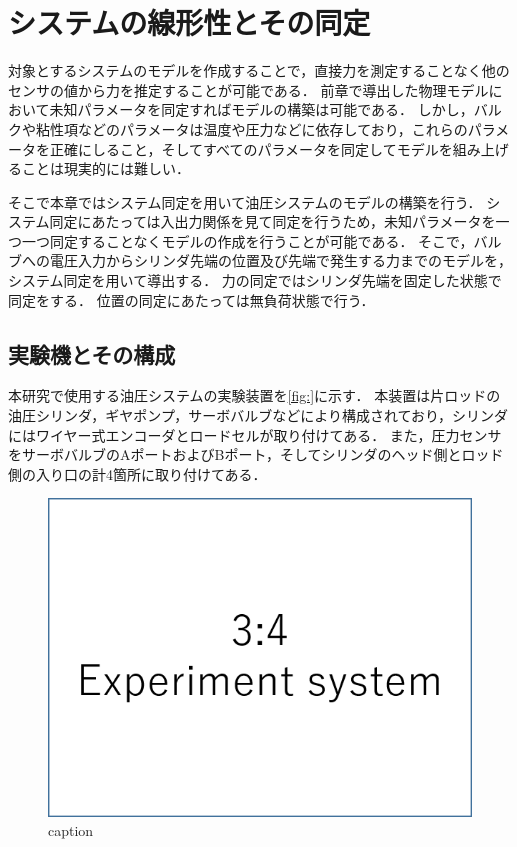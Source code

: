 \chapter{システムの線形性とその同定}
対象とするシステムのモデルを作成することで，直接力を測定することなく他のセンサの値から力を推定することが可能である．
前章で導出した物理モデルにおいて未知パラメータを同定すればモデルの構築は可能である．
しかし，バルクや粘性項などのパラメータは温度や圧力などに依存しており，これらのパラメータを正確にしること，そしてすべてのパラメータを同定してモデルを組み上げることは現実的には難しい．

そこで本章ではシステム同定を用いて油圧システムのモデルの構築を行う．
システム同定にあたっては入出力関係を見て同定を行うため，未知パラメータを一つ一つ同定することなくモデルの作成を行うことが可能である．
そこで，バルブへの電圧入力からシリンダ先端の位置及び先端で発生する力までのモデルを，システム同定を用いて導出する．
力の同定ではシリンダ先端を固定した状態で同定をする．
位置の同定にあたっては無負荷状態で行う．
\section{実験機とその構成}
本研究で使用する油圧システムの実験装置を\figname\ref{fig:}に示す．
本装置は片ロッドの油圧シリンダ，ギヤポンプ，サーボバルブなどにより構成されており，シリンダにはワイヤー式エンコーダとロードセルが取り付けてある．
また，圧力センサをサーボバルブのAポートおよびBポート，そしてシリンダのヘッド側とロッド側の入り口の計4箇所に取り付けてある．
\begin{figure}[t]
    \centering
        \includegraphics[keepaspectratio, scale=1.0]{contents/システム同定/figure/3-4ExperimentSystem.png}
        \caption{caption}
        \label{fig:figlabel}
\end{figure}

